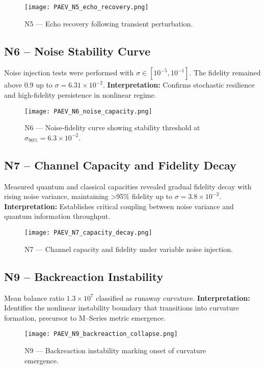 \documentclass[11pt,a4paper]{article}
\begin{document}
\begin{figure}[h]
\centering
\texttt{[image: PAEV\_N5\_echo\_recovery.png]}
\caption{N5 --- Echo recovery following transient perturbation.}
\end{figure}

\subsection{N6 -- Noise Stability Curve}
Noise injection tests were performed with \(\sigma \in [10^{-5}, 10^{-1}]\).
The fidelity remained above 0.9 up to \(\sigma = 6.31\times10^{-2}\).
\textbf{Interpretation:} Confirms stochastic resilience and high-fidelity persistence in nonlinear regime.

\begin{figure}[h]
\centering
\texttt{[image: PAEV\_N6\_noise\_capacity.png]}
\caption{N6 --- Noise-fidelity curve showing stability threshold at $\sigma_{90\%}=6.3\times10^{-2}$.}
\end{figure}

\subsection{N7 -- Channel Capacity and Fidelity Decay}
Measured quantum and classical capacities revealed gradual fidelity decay with rising noise variance, maintaining >95\% fidelity up to \(\sigma = 3.8\times10^{-2}\).
\textbf{Interpretation:} Establishes critical coupling between noise variance and quantum information throughput.

\begin{figure}[h]
\centering
\texttt{[image: PAEV\_N7\_capacity\_decay.png]}
\caption{N7 --- Channel capacity and fidelity under variable noise injection.}
\end{figure}

\subsection{N9 -- Backreaction Instability}
Mean balance ratio \(1.3\times10^{7}\) classified as runaway curvature.
\textbf{Interpretation:} Identifies the nonlinear instability boundary that transitions into curvature formation, precursor to M--Series metric emergence.

\begin{figure}[h]
\centering
\texttt{[image: PAEV\_N9\_backreaction\_collapse.png]}
\caption{N9 --- Backreaction instability marking onset of curvature emergence.}
\end{figure}
\end{document}

